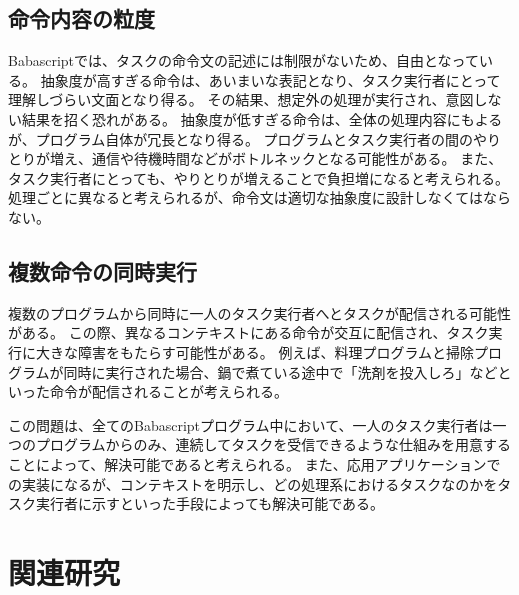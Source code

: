 \subsection{命令内容の粒度}\label{ux547dux4ee4ux5185ux5bb9ux306eux7c92ux5ea6}

Babascriptでは、タスクの命令文の記述には制限がないため、自由となっている。
抽象度が高すぎる命令は、あいまいな表記となり、タスク実行者にとって理解しづらい文面となり得る。
その結果、想定外の処理が実行され、意図しない結果を招く恐れがある。
抽象度が低すぎる命令は、全体の処理内容にもよるが、プログラム自体が冗長となり得る。
プログラムとタスク実行者の間のやりとりが増え、通信や待機時間などがボトルネックとなる可能性がある。
また、タスク実行者にとっても、やりとりが増えることで負担増になると考えられる。
処理ごとに異なると考えられるが、命令文は適切な抽象度に設計しなくてはならない。

\subsection{複数命令の同時実行}\label{ux8907ux6570ux547dux4ee4ux306eux540cux6642ux5b9fux884c}

複数のプログラムから同時に一人のタスク実行者へとタスクが配信される可能性がある。
この際、異なるコンテキストにある命令が交互に配信され、タスク実行に大きな障害をもたらす可能性がある。
例えば、料理プログラムと掃除プログラムが同時に実行された場合、鍋で煮ている途中で「洗剤を投入しろ」などといった命令が配信されることが考えられる。

この問題は、全てのBabascriptプログラム中において、一人のタスク実行者は一つのプログラムからのみ、連続してタスクを受信できるような仕組みを用意することによって、解決可能であると考えられる。
また、応用アプリケーションでの実装になるが、コンテキストを明示し、どの処理系におけるタスクなのかをタスク実行者に示すといった手段によっても解決可能である。

\section{関連研究}\label{ux95a2ux9023ux7814ux7a76}

